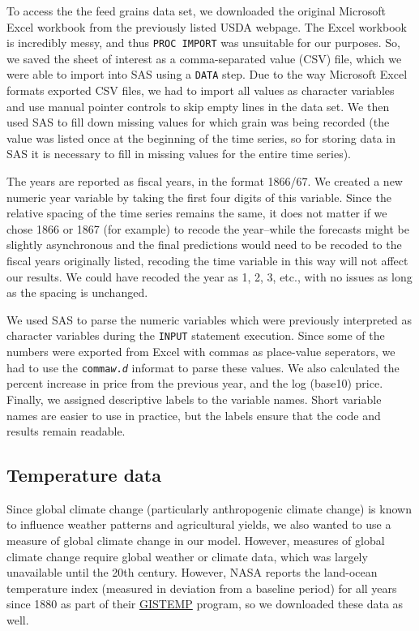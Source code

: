 \documentclass[11pt]{article}
\begin{document}
To access the the feed grains data set, we downloaded the original Microsoft
Excel workbook from the previously listed USDA webpage. The Excel workbook is
incredibly messy, and thus \texttt{PROC IMPORT} was unsuitable for our
purposes. So, we saved the sheet of interest as a comma-separated value (CSV)
file, which we were able to import into SAS using a \texttt{DATA} step. Due to
the way Microsoft Excel formats exported CSV files, we had to import all values
as character variables and use manual pointer controls to skip empty lines in
the data set. We then used SAS to fill down missing values for which grain was
being recorded (the value was listed once at the beginning of the time series,
so for storing data in SAS it is necessary to fill in missing values for the
entire time series).

The years are reported as fiscal years, in the format 1866/67. We created a new
numeric year variable by taking the first four digits of this variable. Since
the relative spacing of the time series remains the same, it does not matter if
we chose 1866 or 1867 (for example) to recode the year--while the forecasts
might be slightly asynchronous and the final predictions would need to be
recoded to the fiscal years originally listed, recoding the time variable in
this way will not affect our results. We could have recoded the year as 1, 2,
3, etc., with no issues as long as the spacing is unchanged.

We used SAS to parse the numeric variables which were previously interpreted as
character variables during the \texttt{INPUT} statement execution. Since some
of the numbers were exported from Excel with commas as place-value seperators,
we had to use the \texttt{comma\textit{w}.\textit{d}} informat to parse these
values. We also calculated the percent increase in price from the previous
year, and the log (base10) price. Finally, we assigned descriptive labels to
the variable names. Short variable names are easier to use in practice, but the
labels ensure that the code and results remain readable.

\subsection*{Temperature data}

Since global climate change (particularly anthropogenic climate change) is
known to influence weather patterns and agricultural yields, we also wanted to
use a measure of global climate change in our model. However, measures of
global climate change require global weather or climate data, which was largely
unavailable until the 20th century. However, NASA reports the land-ocean
temperature index (measured in deviation from a baseline period) for all years
since 1880 as part of their \href{https://data.giss.nasa.gov/gistemp/}{GISTEMP}
program, so we downloaded these data as well.
\end{document}
